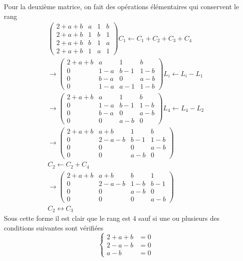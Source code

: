 Pour la deuxième matrice, on fait des opérations élémentaires qui conservent le rang 
\begin{multline*}
\begin{pmatrix}
  2+a+b &  a & 1 & b \\
  2+a+b &  1 & b & 1 \\
  2+a+b &  b & 1 & a \\
  2+a+b &  1 & a & 1
\end{pmatrix} C_1 \leftarrow C_1 + C_2 + C_3 + C_4\\
\rightarrow
\begin{pmatrix}
  2+a+b &  a  & 1   & b   \\
  0     & 1-a & b-1 & 1-b \\
  0     & b-a & 0   & a-b \\
  0     & 1-a & a-1 & 1-b
\end{pmatrix} L_i \leftarrow L_i - L_1\\
\rightarrow
\begin{pmatrix}
  2+a+b &  a  & 1   & b   \\
  0     & 1-a & b-1 & 1-b \\
  0     & b-a & 0   & a-b \\
  0     & 0   & a-b & 0
\end{pmatrix} L_4 \leftarrow L_4 - L_2 \\
\rightarrow
\begin{pmatrix}
  2+a+b & a+b   & 1   & b   \\
  0     & 2-a-b & b-1 & 1-b \\
  0     & 0     & 0   & a-b \\
  0     & 0     & a-b & 0
\end{pmatrix} \\ C_2 \leftarrow C_2 + C_4 \\
\rightarrow
\begin{pmatrix}
  2+a+b & a+b   & b   & 1   \\
  0     & 2-a-b & 1-b & b-1 \\
  0     & 0     & a-b & 0 \\
  0     & 0     & 0 & a-b
\end{pmatrix} \\ C_2 \leftrightarrow C_3
\end{multline*}
Sous cette forme il est clair que le rang est 4 sauf si une ou plusieurs des conditions suivantes sont vérifiées
\[
  \left\lbrace
  \begin{aligned}
    2+a+b &= 0 \\ 2-a-b &= 0 \\ a-b &= 0
  \end{aligned}
  \right.
\]
